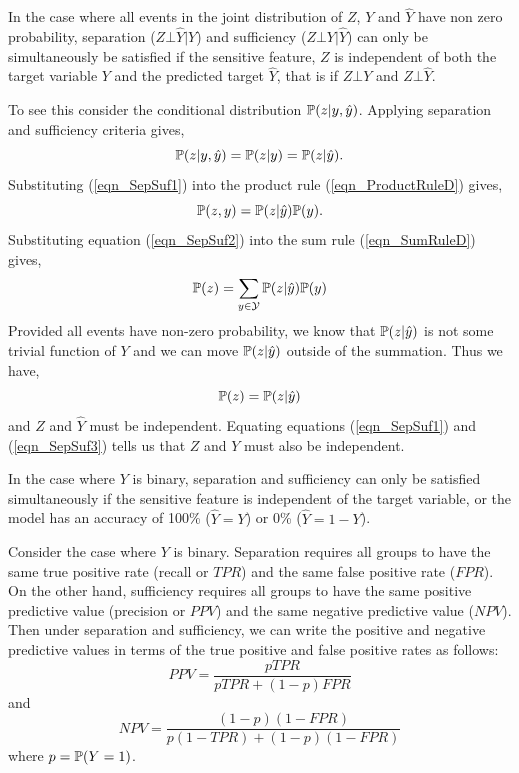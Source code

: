 \begin{lookbox}
In the case where all events in the joint distribution of $Z$, $Y$ and $\hat{Y}$ have non zero probability, separation ($Z \bot \hat{Y} | Y$) and sufficiency ($Z \bot Y | \hat{Y}$) can only be simultaneously be satisfied if the sensitive feature, $Z$ is independent of both the target variable $Y$ and the predicted target $\hat{Y}$, that is if $Z \bot Y$ and $Z \bot \hat{Y}$.
\end{lookbox}

To see this consider the conditional distribution $\mathbb{P}(z|y,\hat{y})$. Applying separation and sufficiency criteria gives,
\begin{equation} \label{eqn_SepSuf1}
\mathbb{P}(z|y,\hat{y}) = \mathbb{P}(z|y) = \mathbb{P}(z|\hat{y}).
\end{equation}
Substituting (\ref{eqn_SepSuf1}) into the product rule (\ref{eqn_ProductRuleD}) gives,
\begin{equation}\label{eqn_SepSuf2}
\mathbb{P}(z,y) = \mathbb{P}(z|\hat{y}) \mathbb{P}(y).
\end{equation}
Substituting equation (\ref{eqn_SepSuf2}) into the sum rule (\ref{eqn_SumRuleD}) gives,
\[
\mathbb{P}(z) = \sum_{y\in\mathcal{Y}} \mathbb{P}(z|\hat{y}) \mathbb{P}(y)
\]
Provided all events have non-zero probability, we know that $\mathbb{P}(z|\hat{y})$ is not some trivial function of $Y$ and we can move $\mathbb{P}(z|\hat{y})$ outside of the summation. Thus we have,
\begin{equation}\label{eqn_SepSuf3}
\mathbb{P}(z) = \mathbb{P}(z|\hat{y})
\end{equation}
and $Z$ and $\hat{Y}$ must be independent. Equating equations (\ref{eqn_SepSuf1}) and (\ref{eqn_SepSuf3}) tells us that $Z$ and $Y$ must also be independent.

\begin{lookbox}
In the case where $Y$ is binary, separation and sufficiency can only be satisfied simultaneously if the sensitive feature is independent of the target variable, or the model has an accuracy of 100\% ($\hat{Y}=Y$) or 0\% ($\hat{Y}=1-Y$).
\end{lookbox}

Consider the case where $Y$ is binary. Separation requires all groups to have the same true positive rate (recall or $TPR$) and the same false positive rate ($FPR$). On the other hand, sufficiency requires all groups to have the same positive predictive value (precision or $PPV$) and the same negative predictive value ($NPV$). Then under separation and sufficiency, we can write the positive and negative predictive values in terms of the true positive and false positive rates as follows:
\begin{equation} \label{eqn_PPV}
PPV = \frac{p TPR}{p TPR + (1-p)FPR}
\end{equation}
and
\begin{equation} \label{eqn_NPV}
NPV = \frac{(1-p)(1-FPR)}{p(1-TPR) + (1-p)(1-FPR)}
\end{equation}
where $p=\mathbb{P}(Y=1)$.

